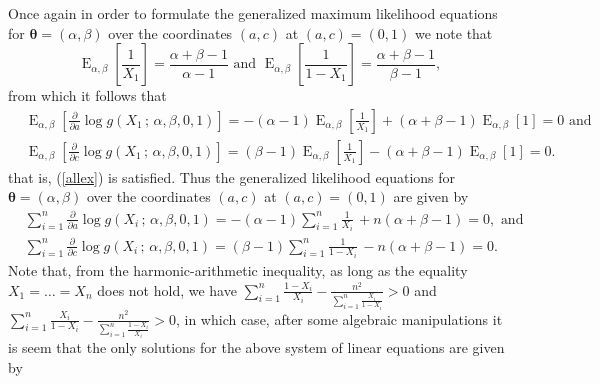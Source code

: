 \documentclass[12pt]{article} %
\newcommand{\bs}{\boldsymbol}
\newcommand{\on}{\operatorname}
\theoremstyle{definition}
\begin{document}
Once again in order to formulate the generalized maximum likelihood equations for $\bs{\theta}=(\alpha,\beta)$ over the coordinates $(a,c)$ at $(a,c)=(0,1)$ we note that
\begin{equation}\label{relations2}\on{E}_{\alpha,\beta}\left[\frac{1}{X_1}\right]=\frac{\alpha+\beta-1}{\alpha-1}\mbox{ and }\on{E}_{\alpha,\beta}\left[\frac{1}{1-X_1}\right]=\frac{\alpha+\beta-1}{\beta-1},
\end{equation}
from which it follows that
\begin{equation*}
\begin{aligned}
&\on{E}_{\alpha,\beta} \left[\frac{\partial}{\partial a}  \log g(X_1\,;\,\alpha,\beta,0,1)\right] = -(\alpha-1) \on{E}_{\alpha,\beta}\left[\frac{1}{X_1}\right] + (\alpha+\beta-1) \on{E}_{\alpha,\beta}\left[1\right]=0\mbox{ and}\\
&\on{E}_{\alpha,\beta} \left[\frac{\partial}{\partial c}  \log g(X_1\,;\,\alpha,\beta,0,1)\right] =(\beta-1) \on{E}_{\alpha,\beta}\left[\frac{1}{X_1}\right] - (\alpha+\beta-1) \on{E}_{\alpha,\beta}\left[1\right]=0.
\end{aligned}
\end{equation*}
that is, (\ref{allex}) is satisfied. Thus  the generalized likelihood equations for $\bs{\theta}=(\alpha,\beta)$ over the coordinates $(a,c)$ at $(a,c)=(0,1)$ are given by
\begin{equation*}
\begin{aligned}
&\sum_{i=1}^n \frac{\partial}{\partial a}  \log g(X_i\,;\,\alpha,\beta,0,1)=-(\alpha -1)\sum _{i=1}^{n}{\frac {1}{X_{i}}}\,+n(\alpha +\beta -1)=0,\mbox{ and }\\
&\sum_{i=1}^n \frac{\partial}{\partial c}  \log g(X_i\,;\,\alpha,\beta,0,1)=(\beta-1)\sum _{i=1}^{n}{\frac {1}{1-X_{i}}}\,-n(\alpha +\beta -1)=0.
\end{aligned}
\end{equation*}
Note that, from the harmonic-arithmetic inequality, as long as the equality $X_1=\ldots=X_n$ does not hold, we have $\sum_{i=1}^{n}\frac{1-X_i}{X_i}-\frac{n^2}{\sum_{i=1}^{n}\frac{X_i}{1-X_i}}>0$ and $\sum_{i=1}^{n}\frac{X_i}{1-X_i}-\frac{n^2}{\sum_{i=1}^{n}\frac{1-X_i}{X_i}}>0$, in which case, after some algebraic manipulations it is seem that the only solutions for the above system of linear equations are given by
\end{document}
